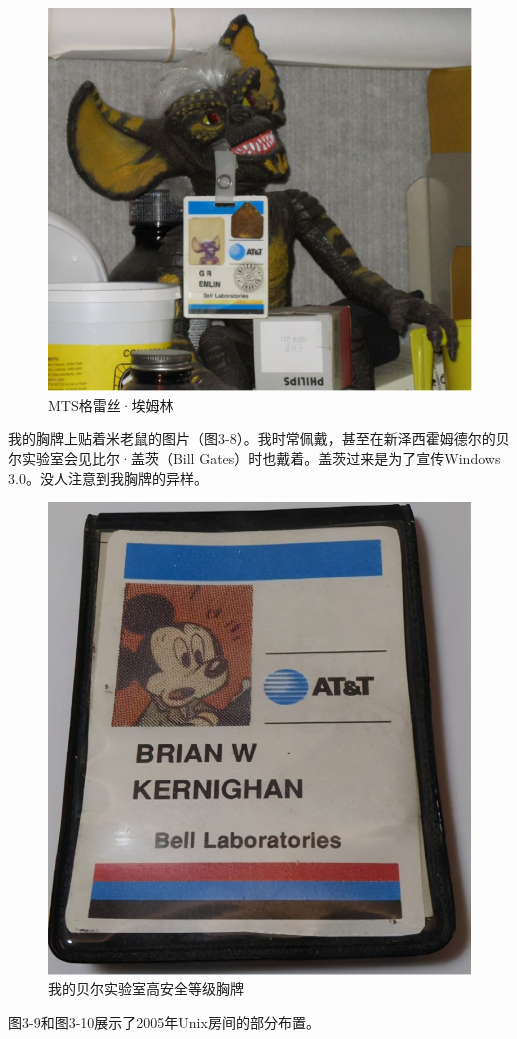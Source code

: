 \documentclass[a4paper,12pt,UTF8,twoside]{ctexbook}
\begin{document}
\begin{figure}[htbp]
	\centering
	\includegraphics[width=0.7\linewidth]{25}
	\caption{MTS格雷丝·埃姆林}
	\label{fig:1}
\end{figure}

我的胸牌上贴着米老鼠的图片（图3-8）。我时常佩戴，甚至在新泽西霍姆德尔的贝尔实验室会见比尔·盖茨（Bill Gates）时也戴着。盖茨过来是为了宣传Windows 3.0。没人注意到我胸牌的异样。

\begin{figure}[htbp]
	\centering
	\includegraphics[width=0.7\linewidth]{26}
	\caption{我的贝尔实验室高安全等级胸牌}
	\label{fig:1}
\end{figure}

图3-9和图3-10展示了2005年Unix房间的部分布置。
\end{document}
